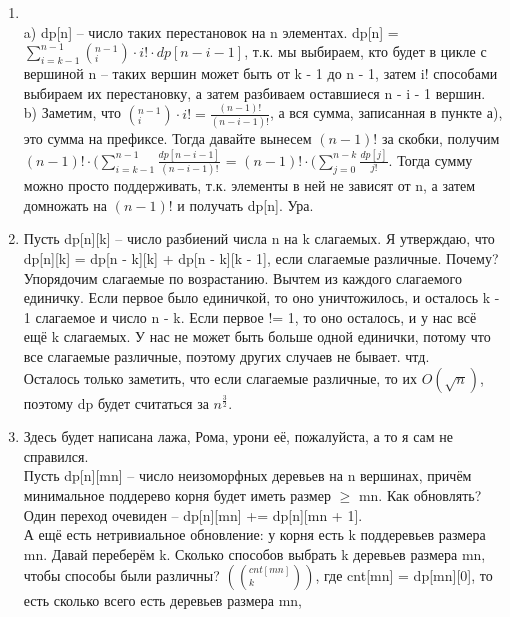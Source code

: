\documentclass[12pt]{article}
\begin{document}
\begin{enumerate}
	\setlength{\parskip}{0pt} 
	\setlength{\itemsep}{0pt} 
	\item ~\\
    a) dp[n] -- число таких перестановок на n элементах. 
    dp[n] = $\sum^{n - 1}_{i = k - 1}(^{n - 1}_i) \cdot i! \cdot dp[n - i - 1]$, т.к. мы выбираем, кто 
    будет в цикле с вершиной n -- таких вершин может быть от k - 1 до n - 1, затем i! способами 
    выбираем их перестановку, а затем разбиваем оставшиеся n - i - 1 вершин. \\
    b) Заметим, что $(^{n - 1}_i) \cdot i! = \frac{(n - 1)!}{(n - i - 1)!}$, а вся сумма, 
    записанная в пункте а), это сумма на префиксе. Тогда давайте вынесем $(n - 1)!$ за скобки, 
    получим $(n - 1)! \cdot (\sum^{n - 1}_{i = k - 1} \frac{dp[n - i - 1]}{(n - i - 1)!}$ = 
    $(n - 1)! \cdot (\sum^{n - k}_{j = 0} \frac{dp[j]}{j!}$. Тогда сумму можно просто 
    поддерживать, т.к. элементы в ней не зависят от n, а затем домножать на $(n - 1)!$ и 
    получать dp[n]. Ура.
    \item Пусть dp[n][k] -- число разбиений числа n на k слагаемых. Я утверждаю, что dp[n][k] = 
    dp[n - k][k] + dp[n - k][k - 1], если слагаемые различные. Почему? Упорядочим слагаемые по 
    возрастанию. Вычтем из каждого слагаемого единичку. Если первое было единичкой, то оно 
    уничтожилось, и осталось k - 1 слагаемое и число n - k. Если первое != 1, то оно осталось, и 
    у нас всё ещё k слагаемых. У нас не может быть больше одной единички, потому что все слагаемые 
    различные, поэтому других случаев не бывает. чтд. \\
    Осталось только заметить, что если слагаемые различные, то их $O(\sqrt{n})$, поэтому dp будет 
    считаться за $n^{\frac{3}{2}}$. \\
    \item Здесь будет написана лажа, Рома, урони её, пожалуйста, а то я сам не справился. \\
    Пусть dp[n][mn] -- число неизоморфных деревьев на n вершинах, причём минимальное 
    поддерево корня будет иметь размер $\ge$ mn. Как обновлять? \\
    Один переход очевиден -- dp[n][mn] += dp[n][mn + 1]. \\
    А ещё есть нетривиальное обновление: у корня есть k поддеревьев размера mn. Давай 
    переберём k. Сколько способов выбрать k деревьев размера mn, чтобы способы были различны? 
    $((^{cnt[mn]}_k))$, где cnt[mn] = dp[mn][0], то есть сколько всего есть деревьев размера mn, 

\end{enumerate}
\end{document}
